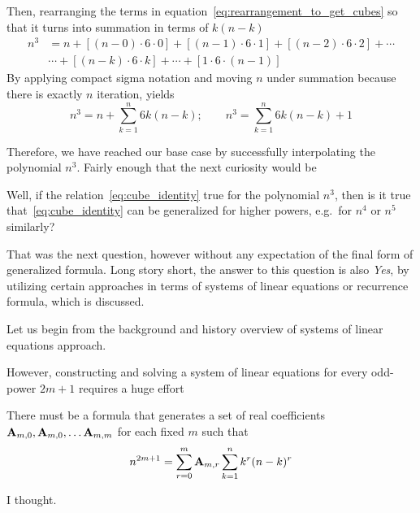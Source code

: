 Then, rearranging the terms in equation~\eqref{eq:rearrangement_to_get_cubes} so that it turns into summation
in terms of $k (n-k)$
\begin{equation*}
    \begin{split}
        n^3 &= n + [(n-0) \cdot 6 \cdot 0] + [(n-1)\cdot6\cdot1] + [(n-2)\cdot6\cdot2] + \cdots \\
        &\cdots + [(n-k)\cdot 6 \cdot k] + \cdots + [1\cdot6\cdot(n-1)]
    \end{split}
\end{equation*}
By applying compact sigma notation and moving $n$ under summation because there is exactly $n$ iteration, yields
\begin{equation}
    \label{eq:cube_identity}
    n^3 = n + \sum_{k=1}^{n} 6k(n-k); \quad \quad n^3 = \sum_{k=1}^{n} 6k(n-k) + 1
\end{equation}

Therefore, we have reached our base case by successfully interpolating the polynomial $n^3$.
Fairly enough that the next curiosity would be
\begin{question}
    Well, if the relation~\eqref{eq:cube_identity} true for the polynomial $n^3$,
    then is it true that~\eqref{eq:cube_identity} can be generalized for higher powers, e.g.\ for $n^4$ or $n^5$ similarly?
    \label{question:higher_powers}
\end{question}
That was the next question, however without any expectation of the final form of generalized formula.
Long story short, the answer to this question is also \textit{Yes}, by utilizing certain approaches
in terms of systems of linear equations or recurrence formula, which is discussed.

Let us begin from the background and history overview of systems of linear equations approach.

However, constructing and solving a system of linear equations for every odd-power $2m+1$ requires a huge effort
\begin{assumption}
    There must be a formula that generates a set of real coefficients ${\mathbf{A}} \sb{m,0},{\mathbf{A}} \sb{m,0}, \dots {\mathbf{A}} \sb{m,m}$
    for each fixed $m$ such that
    \begin{align*}
        n^{2m+1} = \sum_{r=0}^{m} {\mathbf{A}} \sb{m,r} \sum_{k=1}^{n} k^{r} (n-k)^{r}
    \end{align*}
\end{assumption}
I thought.



